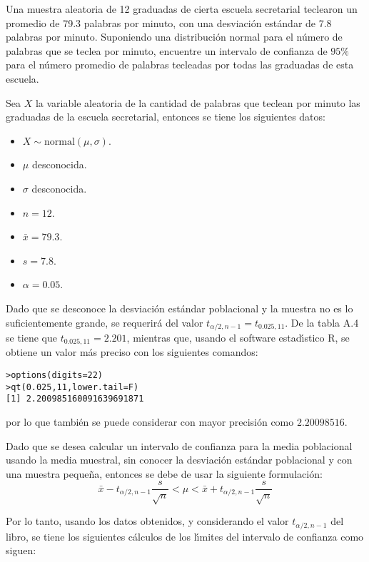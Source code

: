 \begin{enunciado}
 Una muestra aleatoria de 12 graduadas de cierta escuela secretarial teclearon un promedio de 79.3 palabras por minuto, con una desviaci\'on est\'andar de 7.8 palabras por minuto. Suponiendo una distribuci\'on normal para el n\'umero de palabras que se teclea por minuto, encuentre un intervalo de confianza de $95\%$ para el n\'umero promedio de palabras tecleadas por todas las graduadas de esta escuela.
\end{enunciado}

\begin{solucion}
 Sea $X$ la variable aleatoria de la cantidad de palabras que teclean por minuto las graduadas de la escuela secretarial, entonces se tiene los siguientes datos:
 \begin{itemize}
  \item $X\sim\text{normal}(\mu,\sigma)$.
  \item $\mu$ desconocida.
  \item $\sigma$ desconocida.
  \item $n=12$.
  \item $\bar{x}=79.3$.
  \item $s=7.8$.
  \item $\alpha=0.05$.
 \end{itemize}
 Dado que se desconoce la desviaci\'on est\'andar poblacional y la muestra no es lo suficientemente grande, se requerir\'a del valor $t_{\alpha/2,n-1} = t_{0.025,11}$. De la tabla A.4 se tiene que $t_{0.025,11} = 2.201$, mientras que, usando el software estad\'{\i}stico R, se obtiene un valor m\'as preciso con los siguientes comandos:
 \begin{verbatim}
>options(digits=22)
>qt(0.025,11,lower.tail=F)
[1] 2.200985160091639691871
 \end{verbatim}
 \vspace{-0.5cm}
 por lo que tambi\'en se puede considerar con mayor precisi\'on como $2.20098516$.
 \par 
 Dado que se desea calcular un intervalo de confianza para la media poblacional usando la media muestral, sin conocer la desviaci\'on est\'andar poblacional y con una muestra peque\~na, entonces se debe de usar la siguiente formulaci\'on:
 \begin{equation*}
  \bar{x} - t_{\alpha/2,n-1}\frac{s}{\sqrt{n}} < \mu < \bar{x} + t_{\alpha/2,n-1}\frac{s}{\sqrt{n}}
 \end{equation*}
 \par 
 Por lo tanto, usando los datos obtenidos, y considerando el valor $t_{\alpha/2,n-1}$ del libro, se tiene los siguientes c\'alculos de los l\'{\i}mites del intervalo de confianza como siguen:

\end{solucion}
